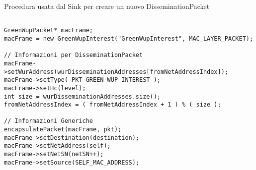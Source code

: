 \begin{listing}[h]
    \caption{Procedura usata dal Sink per creare un nuovo DisseminationPacket}
    \label{code:createDP}
    \begin{verbatim}

GreenWupPacket* macFrame;
macFrame = new GreenWupInterest("GreenWupInterest", MAC_LAYER_PACKET);

// Informazioni per DisseminationPacket
macFrame->setWurAddress(wurDisseminationAddresses[fromNetAddressIndex]);
macFrame->setType( PKT_GREEN_WUP_INTEREST );
macFrame->setHc(level);
int size = wurDisseminationAddresses.size();
fromNetAddressIndex = ( fromNetAddressIndex + 1 ) % ( size );

// Informazioni Generiche
encapsulatePacket(macFrame, pkt);
macFrame->setDestination(destination);
macFrame->setNetAddress(self);
macFrame->setNetSN(netSN++);
macFrame->setSource(SELF_MAC_ADDRESS);

    \end{verbatim}
\end{listing}